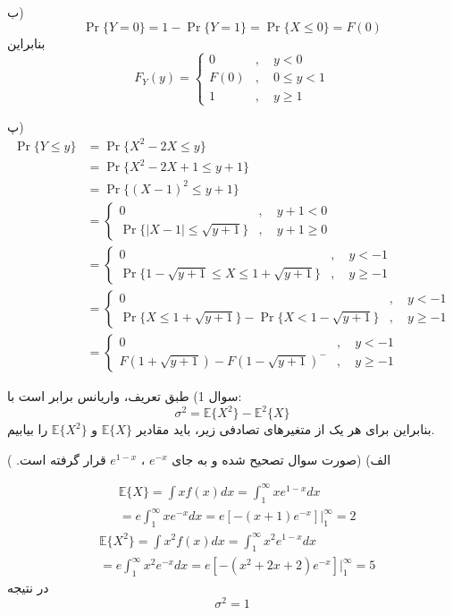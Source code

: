 \documentclass[10pt,letterpaper]{report}
\begin{document}
ب) 
$$
\Pr\{Y=0\}=1-\Pr\{Y=1\}=\Pr\{X\le0\}=F(0)
$$
بنابراین
$$
F_Y(y)=\begin{cases}
0&,\quad y<0\\
F(0)&,\quad 0\le y<1\\
1&,\quad y\ge 1
\end{cases}
$$

پ) 
\[
\begin{split}
\Pr\{Y\le y\}&=\Pr\{X^2-2X\le y\}
\\&=\Pr\{X^2-2X+1\le y+1\}
\\&=\Pr\{(X-1)^2\le y+1\}
\\&=\begin{cases}
0&,\quad y+1<0\\
\Pr\{|X-1|\le \sqrt{y+1}\}&,\quad y+1\ge 0
\end{cases}
\\&=\begin{cases}
0&,\quad y<-1\\
\Pr\{1-\sqrt{y+1}\le X\le 1+\sqrt{y+1}\}&,\quad y\ge -1
\end{cases}
\\&=\begin{cases}
0&,\quad y<-1\\
\Pr\{X\le 1+\sqrt{y+1}\}-\Pr\{X< 1-\sqrt{y+1}\}&,\quad y\ge -1
\end{cases}
\\&=\begin{cases}
0&,\quad y<-1\\
F(1+\sqrt{y+1})-F(1-\sqrt{y+1})^-&,\quad y\ge -1
\end{cases}
\end{split}
\]

سوال 1) طبق تعریف، واریانس برابر است با:
$$
\sigma^2=\mathbb{E}\{X^2\}-\mathbb{E}^2\{X\}
$$
بنابراین برای هر یک از متغیرهای تصادفی زیر، باید مقادیر 
$
\mathbb{E}\{X\}
$
و
$
\mathbb{E}\{X^2\}
$
را بیابیم.

الف) 
{\color{red}
(صورت سوال تصحیح شده و به جای
 $e^{-x}$
،
$e^{1-x}$
قرار گرفته است.
)
}

\begin{equation}
\begin{split}
&
\mathbb{E}\{X\}=\int xf(x)dx=\int_1^\infty xe^{1-x}dx
\\&=
e\int_1^\infty xe^{-x}dx
=e[-(x+1)e^{-x}]|_{1}^\infty=2
\end{split}
\end{equation}
\begin{equation}
\begin{split}
&
\mathbb{E}\{X^2\}=\int x^2f(x)dx=\int_1^\infty x^2e^{1-x}dx
\\&=
e\int_1^\infty x^2e^{-x}dx
=e[-(x^2+2x+2)e^{-x}]|_{1}^\infty=5
\end{split}
\end{equation}
در نتیجه
$$
\sigma^2=1
$$
\end{document}
